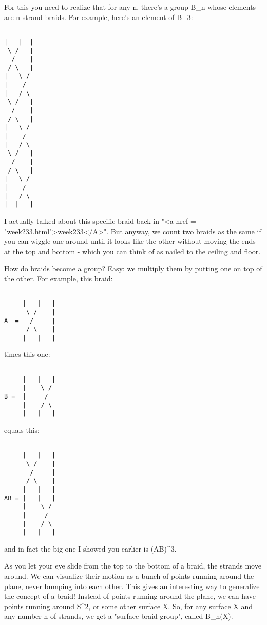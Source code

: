 For this you need to realize that for any n, there's a group B_{n}
whose elements are n-strand braids.  For example, here's an element
of B_{3}:


\begin{verbatim}

|   |  |  
 \ /   | 
  /    |       
 / \   |
|   \ /    
|    /         
|   / \   
 \ /   | 
  /    |      
 / \   |
|   \ /    
|    /        
|   / \   
 \ /   | 
  /    |      
 / \   |
|   \ /    
|    /         
|   / \   
|  |   |
\end{verbatim}
    

I actually talked about this specific braid back in "<a href =
"week233.html">week233</A>".  But anyway, we count two braids as
the same if you can wiggle one around until it looks like the other
without moving the ends at the top and bottom - which you can think of
as nailed to the ceiling and floor.

How do braids become a group?  Easy: we multiply them by putting 
one on top of the other.  For example, this braid:


\begin{verbatim}

     |   |   |
      \ /    |
A  =   /     |
      / \    |
     |   |   |
\end{verbatim}
    
times this one:


\begin{verbatim}

     |   |   |   
     |    \ /    
B =  |     /    
     |    / \  
     |   |   |
\end{verbatim}
    
equals this:


\begin{verbatim}

     |   |   |
      \ /    |
       /     |
      / \    |
     |   |   |
AB = |   |   |   
     |    \ /    
     |     /    
     |    / \  
     |   |   |
\end{verbatim}
    
and in fact the big one I showed you earlier is (AB)^{3}.  

As you let your eye slide from the top to the bottom of a braid, the
strands move around.  We can visualize their motion as a bunch of
points running around the plane, never bumping into each other.  This
gives an interesting way to generalize the concept of a braid!
Instead of points running around the plane, we can have points running
around S^{2}, or some other surface X.  So, for any surface
X and any number n of strands, we get a "surface braid
group", called B_{n}(X).

